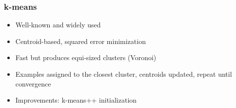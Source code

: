 \documentclass{beamer}
\begin{document}
\begin{frame}
\frametitle{k-means}
    \begin{itemize}
    \item Well-known and widely used
    \item Centroid-based, squared error minimization
    \item Fast but produces equi-sized clusters (Voronoi)
    \item Examples assigned to the closest cluster, centroids updated, repeat until convergence
    \item Improvements: k-means++ initialization
    \end{itemize}
\end{frame}





\end{document}
